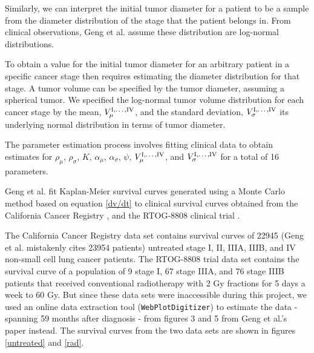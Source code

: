 \documentclass[letterpaper
, superscriptaddress
, twocolumn
, aps
]{revtex4}
\begin{document}
Similarly, we can interpret the initial tumor diameter for a patient to be a sample from the diameter distribution of the stage that the patient belongs in. From clinical observations, Geng et al. assume these distribution are log-normal distributions. 

To obtain a value for the initial tumor diameter for an arbitrary patient in a specific cancer stage then requires estimating the diameter distribution for that stage. A tumor volume can be specified by the tumor diameter, assuming a spherical tumor. We specified the log-normal tumor volume distribution for each cancer stage by the mean, $V_{\mu}^{\text{I,\dots,IV}}$, and the standard deviation, $V_{\sigma}^{\text{I,\dots,IV}}$ its underlying normal distribution in terms of tumor diameter.

The parameter estimation process involves fitting clinical data to obtain estimates for $\rho_{\mu}$, $\rho_{\sigma}$, $K$, $\alpha_{\mu}$, $\alpha_{\sigma}$, $\psi$, $V^{\text{I,\dots,IV}}_{\mu}$, and $V^{\text{I,\dots,IV}}_{\sigma}$ for a total of 16 parameters.

Geng et al. fit Kaplan-Meier survival curves generated using a Monte Carlo method based on equation \eqref{dv/dt} to clinical survival curves obtained from the California Cancer Registry \cite{Raz2007}, and the RTOG-8808 clinical trial \cite{Sause2001}. 

The California Cancer Registry data set contains survival curves of 22945 (Geng et al. mistakenly cites 23954 patients) untreated stage I, II, IIIA, IIIB, and IV non-small cell lung cancer patients. The RTOG-8808 trial data set contains the survival curve of a population of 9 stage I, 67 stage IIIA, and 76 stage IIIB patients that received conventional radiotherapy with 2 Gy fractions for 5 days a week to 60 Gy. But since these data sets were inaccessible during this project, we used an online data extraction tool (\texttt{WebPlotDigitizer}) \cite{Marin2017} to estimate the data  - spanning 59 months after diagnosis - from figures 3 and 5 from Geng et al.'s paper instead. The survival curves from the two data sets are shown in figures \ref{untreated} and \ref{rad}.
\end{document}
